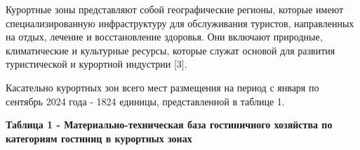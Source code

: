 Курортные зоны представляют собой географические регионы, которые имеют
специализированную инфраструктуру для обслуживания туристов,
направленных на отдых, лечение и восстановление здоровья. Они включают
природные, климатические и культурные ресурсы, которые служат основой
для развития туристической и курортной индустрии {[}3{]}.

Касательно курортных зон всего мест размещения на период с января по
сентябрь 2024 года - 1824 единицы, представленной в таблице 1.

{\bfseries Таблица 1 - Материально-техническая база гостиничного хозяйства
по категориям гостиниц в курортных зонах}

